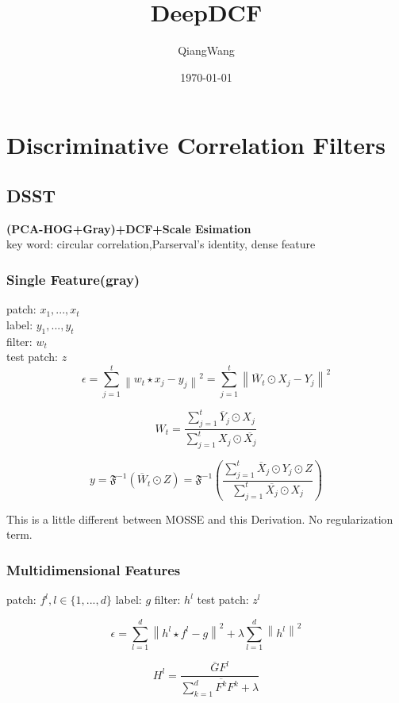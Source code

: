 \documentclass[11pt]{article}
\begin{document}
\title{DeepDCF}
\author{QiangWang}
\date{\today}
\maketitle

\section{Discriminative Correlation Filters}
	\subsection{DSST}
	\textbf{(PCA-HOG+Gray)+DCF+Scale Esimation}\\
	key word: circular correlation,Parserval's identity, dense feature
		\subsubsection{Single Feature(gray)}
		patch: $x_1,...,x_t$	\\
		label: $y_1,...,y_t$	\\
		filter: $w_t$	\\
		test patch: $z$	\\

$$
\epsilon =  \sum_{j=1}^{t}\left \| w_{t}\star x_{j}-y_{j} \right \|^{2} = \sum_{j=1}^{t}\left \| \overline{W}_{t} \odot X_{j}-Y_{j} \right \|^{2}
$$


$$
W_{t}=\frac{\sum_{j=1}^{t}\overline{Y}_{j} \odot X_{j}}{\sum_{j=1}^{t}X_{j} \odot\overline{ X_{j}}} 
$$

$$
y=\mathfrak{F}^{-1} \left( {\overline{W}_{t} \odot Z}\right)
 = \mathfrak{F}^{-1} \left(\frac{\sum_{j=1}^{t}\overline{X}_{j} \odot Y_{j} \odot Z}{\sum_{j=1}^{t}\overline{X_{j}} \odot X_{j}} \right)
$$

This is a little different between MOSSE\cite{MOSSE} and this Derivation. No regularization term.

\subsubsection{Multidimensional Features}

patch: 
$  f^{l} ,l\in \{ 1,...,d \} $
label: 
$ g $
filter: 
$ h^{l} $
test patch: 
$ z^{l} $

$$
\epsilon =  \sum_{l=1}^{d}\left \| h^{l}\star f^{l}-g \right \|^{2} +\lambda \sum_{l=1}^{d}\left\|h^{l} \right\|^{2}
$$

$$
H^{l}=\frac{\overline{G}F^{l}}{\sum_{k=1}^{d}\overline{F^{k}}F^{k}+\lambda}
$$
\end{document}
